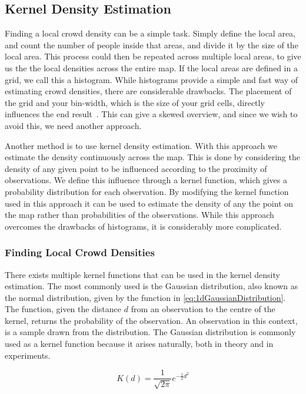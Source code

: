 \subsection{Kernel Density Estimation}
\label{sub:kernelDensityEstimation}

Finding a local crowd density can be a simple task. Simply define the local area, and count the number of people inside that areas, and divide it by the size of the local area. This process could then be repeated across multiple local areas, to give us the the local densities across the entire map. If the local areas are defined in a grid, we call this a histogram. While histograms provide a simple and fast way of estimating crowd densities, there are considerable drawbacks. The placement of the grid and your bin-width, which is the size of your grid cells, directly influences the end result~\cite{histogramDrawbacks}. This can give a skewed overview, and since we wish to avoid this, we need another approach.

Another method is to use kernel density estimation. With this approach we estimate the density continuously across the map. This is done by considering the density of any given point to be influenced according to the proximity of observations. We define this influence through a kernel function, which gives a probability distribution for each observation. By modifying the kernel function used in this approach it can be used to estimate the density of any the point on the map rather than probabilities of the observations. While this approach overcomes the drawbacks of histograms, it is considerably more complicated.

\subsubsection{Finding Local Crowd Densities}
There exists multiple kernel functions that can be used in the kernel density estimation. The most commonly used is the Gaussian distribution, also known as the normal distribution, given by the function in \cref{eq:1dGaussianDistribution}. The function, given the distance $d$ from an observation to the centre of the kernel, returns the probability of the observation. An observation in this context, is a sample drawn from the distribution. The Gaussian distribution is commonly used as a kernel function because it arises naturally, both in theory and in experiments.

\begin{equation}
\label{eq:1dGaussianDistribution}
K(d) = \frac{1}{\sqrt{2\pi}} e^{-\frac{1}{2} d^2}
\end{equation}


